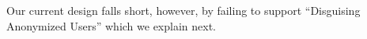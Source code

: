 Our current design falls short, however, by failing to support ``Disguising Anonymized
Users'' which we explain next.


